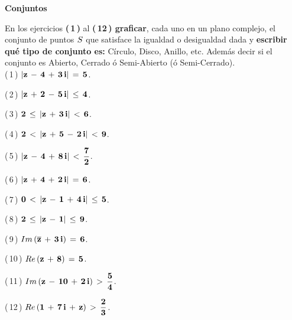 \documentclass[a4paper,11pt,openany]{book}
\begin{document}
\newpage


\graphicspath{ {images/} }

\begin{center}
\textbf{Conjuntos}
\end{center}

En los ejercicios \textbf{(\,1\,)} al \textbf{(\,12\,) graficar}, cada uno en un plano complejo, el conjunto de puntos $\mathnormal{S}$ que satisface la igualdad o desigualdad dada y \textbf{escribir qué tipo de conjunto es:} Círculo, Disco, Anillo, etc. Además decir si el conjunto es Abierto, Cerrado ó Semi-Abierto (ó Semi-Cerrado).\\

\textcolor{ao(english)}{(\,1\,)} $\bf{|z\,-\,4\,+\,3\,i|\,=\,5}$.

\textcolor{ao(english)}{(\,2\,)} $\bf{|z\,+\,2\,-\,5\,i|\,\leq\,4}$.

\textcolor{ao(english)}{(\,3\,)} $\bf{2\,\leq\,|z\,+\,3\,i|\,<\,6}$.

\textcolor{ao(english)}{(\,4\,)} $\bf{2\,<\,|z\,+\,5\,-\,2\,i|\,<\,9}$.

\textcolor{ao(english)}{(\,5\,)} $\bf{|z\,-\,4\,+\,8\,i|\,<\,\dfrac{7}{2}}$.

\textcolor{ao(english)}{(\,6\,)} $\bf{|z\,+\,4\,+\,2\,i|\,=\,6}$.

\textcolor{ao(english)}{(\,7\,)} $\bf{0\,<\,|z\,-\,1\,+\,4\,i|\,\leq\,5}$.

\textcolor{ao(english)}{(\,8\,)} $\bf{2\,\leq\,|z\,-\,1|\,\leq\,9}$.

\textcolor{ao(english)}{(\,9\,)} $\bf{\mathnormal{Im}\,(\overline{z}\,+\,3\,i)\,=\,6}$.

\textcolor{ao(english)}{(\,10\,)} $\bf{\mathnormal{Re}\,(z\,+\,8)\,=\,5}$.

\textcolor{ao(english)}{(\,11\,)} $\bf{\mathnormal{Im}\,(z\,-\,10\,+\,2\,i)\,>\,\dfrac{5}{4}}$.

\textcolor{ao(english)}{(\,12\,)} $\bf{\mathnormal{Re}\,(1\,+\,7\,i\,+\,z)\,>\,\dfrac{2}{3}}$.
\end{document}

